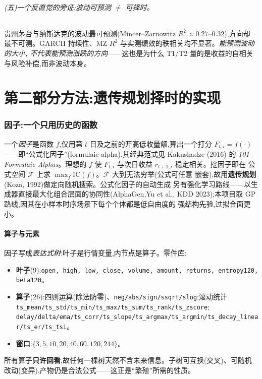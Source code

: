 \documentclass[11pt,a4paper,fontset=mac]{ctexart}
\begin{document}
\paragraph{(五)一个反直觉的旁证:波动\emph{可预测} $\ne$ 可择时。}
贵州茅台与纳斯达克的波动最可预测(Mincer--Zarnowitz $R^2\approx0.27$--$0.32$),方向却
最不可测。GARCH 持续性、MZ $R^2$ 与实测绩效的秩相关均不显著。\emph{能预测波动的大小,
不代表能预测涨跌的方向}——这也是为什么 T1/T2 量的是收益的自相关与风险补偿,而非波动本身。

\part*{第二部分\quad 方法:遗传规划择时的实现}

\section{因子:一个只用历史的函数}
一个\emph{因子}是函数 $f$,仅用第 $t$ 日及之前的开高低收量额,算出一个打分
$F_{t,i}=f(\cdot)$——即``公式化因子''(formulaic alpha),其经典范式见
Kakushadze (2016) 的 \emph{101 Formulaic Alphas}。理想的 $f$ 使 $F_{t,i}$ 与次日收益 $r_{t+1,i}$ 稳定相关。挖因子即在
公式空间 $\mathcal F$ 上求 $\max_{f}\mathrm{IC}(f)$。$\mathcal F$ 大到无法穷举(公式可任意
嵌套),故用\textbf{遗传规划}(Koza, 1992)做定向随机搜索。公式化因子的自动生成
另有强化学习路线——以生成器直接最大化组合层面的协同性(AlphaGen,Yu et al.,
KDD 2023);本项目取 GP 路线,因其在小样本时序场景下每个个体都是低自由度的
强结构先验,过拟合面更小。

\subsection{算子与元素}
因子写成\emph{表达式树}:叶子是行情变量,内节点是算子。零件库:
\begin{itemize}
\item \textbf{叶子}(9):\texttt{open, high, low, close, volume, amount, returns, entropy120, beta120}。
\item \textbf{算子}(26):四则运算(除法防零)、\texttt{neg/abs/sign/ssqrt/slog};滚动统计
\texttt{ts\_mean/ts\_std/ts\_min/ts\_max/ts\_sum/ts\_rank/ts\_zscore};
\texttt{delay/delta/ema/ts\_corr/ts\_slope/ts\_argmax/ts\_argmin/ts\_decay\_linear/ts\_er/ts\_tsi}。
\item \textbf{窗口}:$\{3,5,10,20,40,60,120,244\}$。
\end{itemize}
所有算子\textbf{只许回看},故任何一棵树天然不含未来信息。子树可互换(交叉)、可随机
改动(变异),产物仍是合法公式——这正是``繁殖''所需的性质。
\end{document}
